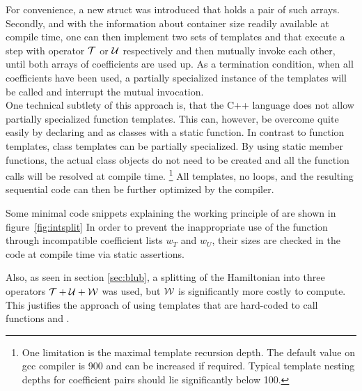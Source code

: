 For convenience, a new struct  was introduced that holds a pair of such arrays.
Secondly, and with the information about container size readily available at compile time, one can then implement two sets of templates  and  that execute a step with operator $\mathcal{T}$ or $\mathcal{U}$ respectively and then mutually invoke each other, until both arrays of coefficients are used up.
As a termination condition, when all coefficients have been used, a partially specialized instance of the templates will be called and interrupt the mutual invocation. \\
%
One technical subtlety of this approach is, that the C++ language does not allow partially specialized function templates. This can, however, be overcome quite easily by declaring  and  as classes with a static function.
In contrast to function templates, class templates can be partially specialized.
By using static member functions, the actual class objects do not need to be created and all the function calls will be resolved at compile time.
\footnote{One limitation is the maximal template recursion depth. The default value on gcc compiler is 900 and can be increased if required. Typical template nesting depths for coefficient pairs should lie significantly below 100.}
All templates, no loops, and the resulting sequential code can then be further optimized by the compiler.
\par\medskip
%
Some minimal code snippets explaining the working principle of  are shown in figure~\ref{fig:intsplit}
%
In order to prevent the inappropriate use of the  function through incompatible coefficient lists $w_T$ and $w_U$, their sizes are checked in the code at compile time via static assertions.
\par\medskip
%
Also, as seen in section \ref{sec:blub}, a splitting of the Hamiltonian into three operators $\mathcal{T} + \mathcal{U} + \mathcal{W}$ was used, but $\mathcal{W}$ is significantly more costly to compute.
This justifies the approach of using templates that are hard-coded to call functions  and .

